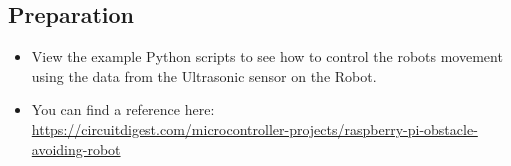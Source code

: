 

\subsection*{\Large Preparation}

    \begin{itemize}
        \item View the example Python scripts to see how to control the robots movement using the data from the Ultrasonic sensor on the Robot.\\
        
        \item You can find a reference here:\\
        \small{\url{https://circuitdigest.com/microcontroller-projects/raspberry-pi-obstacle-avoiding-robot}}\\ 
        
    \end{itemize}